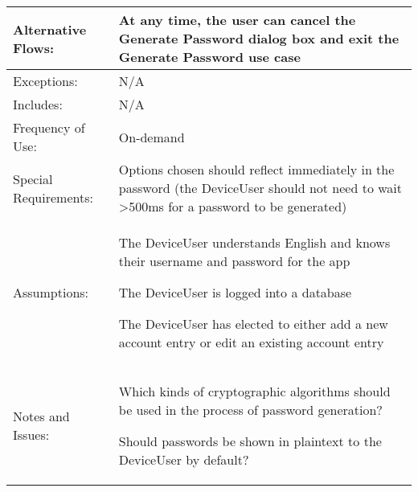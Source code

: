 \documentclass[stu]{apa7}
\newcommand{\nextitem}{\par\hspace*{\labelsep}\textbullet\hspace*{\labelsep}}
\begin{document}
{\begin{xltabular}{\textwidth}{|l|X|}
  Alternative Flows: & \nextitem At any time, the user can cancel the Generate Password dialog box and exit the Generate Password use case \\ \hline

  Exceptions: & N/A \\ \hline

  Includes: & N/A \\ \hline

  Frequency of Use: & On-demand \\ \hline

  Special Requirements: & \nextitem Options chosen should reflect immediately in the password (the DeviceUser should not need to wait >500ms for a password to be generated) \\ \hline

  Assumptions: & \nextitem The DeviceUser understands English and knows their username and password for the app \nextitem The DeviceUser is logged into a database \nextitem The DeviceUser has elected to either add a new account entry or edit an existing account entry \\ \hline

  Notes and Issues: & \nextitem Which kinds of cryptographic algorithms should be used in the process of password generation? \nextitem Should passwords be shown in plaintext to the DeviceUser by default? \\ \hline

\end{xltabular}}
\end{document}
